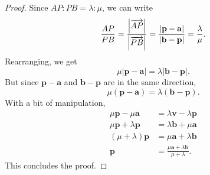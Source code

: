 \documentclass[12pt]{article}
\renewcommand{\vec}{\mathbf}
\begin{document}
\begin{proof}
	Since \(AP : PB = \lambda : \mu\), we can write
	\[ \frac{AP}{PB} = \frac{\abs*{\overrightarrow{AP}}}{\abs*{\overrightarrow{PB}}} = \frac{\abs{\vec{p} - \vec{a}}}{\abs{\vec{b} - \vec{p}}} = \frac{\lambda}{\mu}. \] 
	Rearranging, we get 
	\[ \mu|\vec{p} - \vec{a}| = \lambda |\vec{b} - \vec{p}|. \] 
	But since \(\vec{p} - \vec{a}\) and \(\vec{b} - \vec{p}\) are in the same direction, 
	\[ \mu(\vec{p} - \vec{a}) = \lambda (\vec{b} - \vec{p}). \]
	With a bit of manipulation,
	\begin{align*}
		\mu \vec{p} - \mu \vec{a} &= \lambda \vec{v} - \lambda \vec{p} \\
		\mu \vec{p} + \lambda \vec{p} &= \lambda \vec{b} + \mu \vec{a} \\
		(\mu + \lambda) \vec{p} &= \mu \vec{a} + \lambda \vec{b} \\
		\vec{p} &= \frac{\mu \vec{a} + \lambda \vec{b}}{\mu + \lambda}.
	\end{align*}
	This concludes the proof.
\end{proof}
\end{document}
